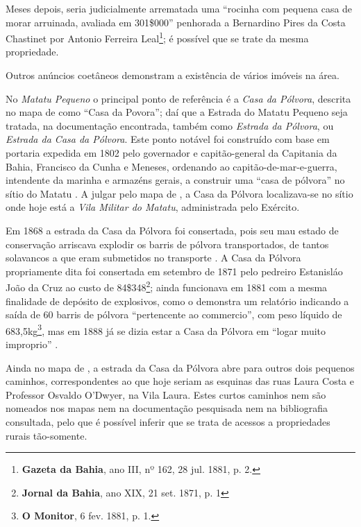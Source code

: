 \begin{citacao}
Meses depois, seria judicialmente arrematada uma ``rocinha com pequena casa de morar arruinada, avaliada em 301\$000'' penhorada a Bernardino Pires da Costa Chastinet por Antonio Ferreira Leal\footnote{\textbf{Gazeta da Bahia}, ano III, nº 162, 28 jul. 1881, p. 2.}; é possível que se trate da mesma propriedade. 

Outros anúncios coetâneos demonstram a existência de vários imóveis na área.

No \textit{Matatu Pequeno} o principal ponto de referência é a \textit{Casa da Pólvora}, descrita no mapa de  como ``Casa da Povora''; daí que a Estrada do Matatu Pequeno seja tratada, na documentação encontrada, também como \textit{Estrada da Pólvora}, ou \textit{Estrada da Casa da Pólvora}. Este ponto notável foi construído com base em portaria expedida em 1802 pelo governador e capitão-general da Capitania da Bahia, Francisco da Cunha e Meneses, ordenando ao capitão-de-mar-e-guerra, intendente da marinha e armazéns gerais, a construir uma ``casa de pólvora'' no sítio do Matatu \cite[p.~93]{oliveira_ultramar_1977}. A julgar pelo mapa de , a Casa da Pólvora localizava-se no sítio onde hoje está a \textit{Vila Militar do Matatu}, administrada pelo Exército. 

Em 1868 a estrada da Casa da Pólvora foi consertada, pois seu mau estado de conservação arriscava explodir os barris de pólvora transportados, de tantos solavancos a que eram submetidos no transporte \cite[anexo~G,~p.~9]{bahia_anexosrelatorio_1868}. A Casa da Pólvora propriamente dita foi consertada em setembro de 1871 pelo pedreiro Estanisláo João da Cruz ao custo de 84\$348\footnote{\textbf{Jornal da Bahia}, ano XIX, 21 set. 1871, p. 1}; ainda funcionava em 1881 com a mesma finalidade de depósito de explosivos, como o demonstra um relatório indicando a saída de 60 barris de pólvora ``pertencente ao commercio'', com peso líquido de 683,5kg\footnote{\textbf{O Monitor}, 6 fev. 1881, p. 1.}, mas em 1888 já se dizia estar a Casa da Pólvora em ``logar muito improprio'' \cite[vol.~3,~p.~40]{bahia_relatorio_1888}. 

Ainda no mapa de , a estrada da Casa da Pólvora abre para outros dois pequenos caminhos, correspondentes ao que hoje seriam as esquinas das ruas Laura Costa e Professor Osvaldo O'Dwyer, na Vila Laura. Estes curtos caminhos nem são nomeados nos mapas nem na documentação pesquisada nem na bibliografia consultada, pelo que é possível inferir que se trata de acessos a propriedades rurais tão-somente.


\end{citacao}
